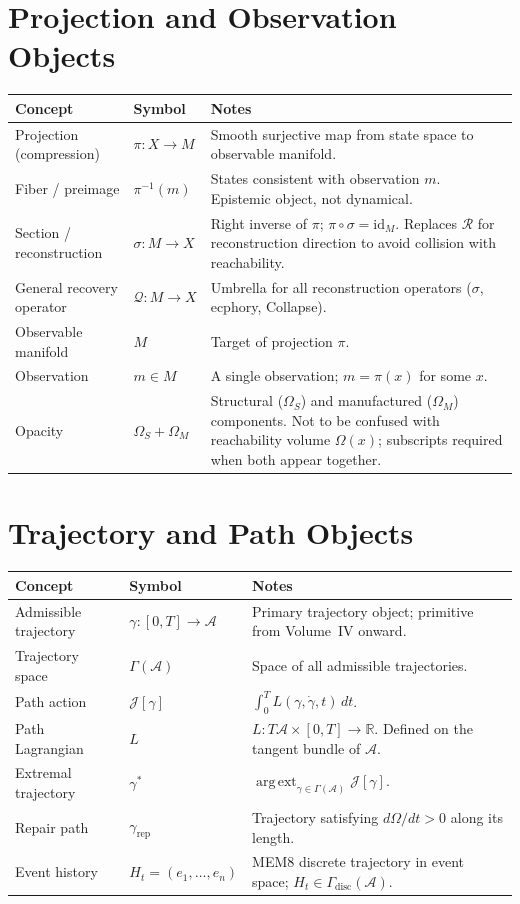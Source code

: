 \documentclass[11pt, a4paper]{book}
\theoremstyle{flyxion}
\theoremstyle{remark}
\begin{document}
\section{Projection and Observation Objects}

\medskip
\begin{longtable}{p{3.5cm}p{3cm}p{6.5cm}}
\toprule
\textbf{Concept} & \textbf{Symbol} & \textbf{Notes} \\
\midrule
Projection (compression) & $\pi: X \to M$ & Smooth surjective map
  from state space to observable manifold. \\
Fiber / preimage & $\pi^{-1}(m)$ & States consistent with observation
  $m$. Epistemic object, not dynamical. \\
Section / reconstruction & $\sigma: M \to X$ & Right inverse of $\pi$;
  $\pi \circ \sigma = \mathrm{id}_M$. Replaces $\mathcal{R}$ for
  reconstruction direction to avoid collision with reachability. \\
General recovery operator & $\mathcal{Q}: M \to X$ & Umbrella for
  all reconstruction operators ($\sigma$, ecphory, Collapse). \\
Observable manifold & $M$ & Target of projection $\pi$. \\
Observation & $m \in M$ & A single observation; $m = \pi(x)$
  for some $x$. \\
Opacity & $\Omega_S + \Omega_M$ & Structural ($\Omega_S$) and
  manufactured ($\Omega_M$) components. Not to be confused with
  reachability volume $\Omega(x)$; subscripts required when both
  appear together. \\
\bottomrule
\end{longtable}

\section{Trajectory and Path Objects}

\medskip
\begin{longtable}{p{3.5cm}p{3cm}p{6.5cm}}
\toprule
\textbf{Concept} & \textbf{Symbol} & \textbf{Notes} \\
\midrule
Admissible trajectory & $\gamma: [0,T] \to \mathcal{A}$ & Primary
  trajectory object; primitive from Volume~IV onward. \\
Trajectory space & $\Gamma(\mathcal{A})$ & Space of all admissible
  trajectories. \\
Path action & $\mathcal{J}[\gamma]$ & $\int_0^T L(\gamma,\dot\gamma,t)
  \, dt$. \\
Path Lagrangian & $L$ & $L: T\mathcal{A} \times [0,T] \to \mathbb{R}$.
  Defined on the tangent bundle of $\mathcal{A}$. \\
Extremal trajectory & $\gamma^*$ & $\operatorname{arg\,ext}_{\gamma
  \in \Gamma(\mathcal{A})} \mathcal{J}[\gamma]$. \\
Repair path & $\gamma_\mathrm{rep}$ & Trajectory satisfying
  $d\Omega/dt > 0$ along its length. \\
Event history & $H_t = (e_1,\ldots,e_n)$ & MEM\textbar{}8 discrete
  trajectory in event space; $H_t \in \Gamma_\mathrm{disc}
  (\mathcal{A})$. \\
\bottomrule
\end{longtable}
\end{document}

